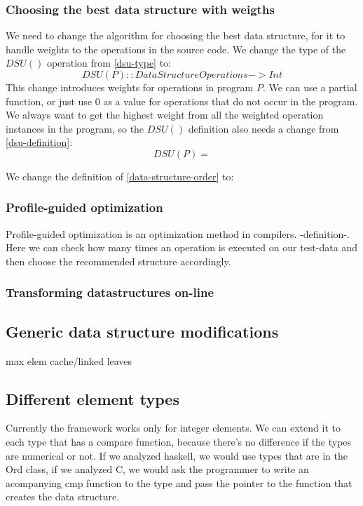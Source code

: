 \documentclass[11pt]{article}
\begin{document}
		\subsubsection{Choosing the best data structure with weigths}
			We need to change the algorithm for choosing the best data structure, for it to handle
			weights to the operations in the source code. We change the type of the $DSU()$ operation from
			\ref{dsu-type} to:
			\begin{equation}
				DSU(P) :: DataStructureOperations -> Int
			\end{equation}
			This change introduces weights for operations in program $P$. We can use a partial function,
			or just use $0$ as a value for operations that do not occur in the program. We always want to
			get the highest weight from all the weighted operation instances in the program, so the $DSU()$
			definition also needs a change from \ref{dsu-definition}:
			\begin{equation}
				DSU(P) = 
			\end{equation}

			We change the definition of \autoref{data-structure-order} to:
			\begin{equation}
			\end{equation}

		\subsubsection{Profile-guided optimization}
			Profile-guided optimization is an optimization method in compilers. -definition-.
			Here we can check how many times an operation is executed on our test-data
			and then choose the recommended structure accordingly.
		\subsubsection{Transforming datastructures on-line}
	\subsection{Generic data structure modifications}

		max elem cache/linked leaves
	\subsection{Different element types}
		Currently the framework works only for integer elements. We can extend it to each type that has a compare function,
		because there's no difference if the types are numerical or not.
		If we analyzed haskell, we would use types that are in the Ord class,
		if we analyzed C, we would ask the programmer to write an acompanying cmp function to the type and pass the pointer to the function that creates the data structure.
\end{document}
